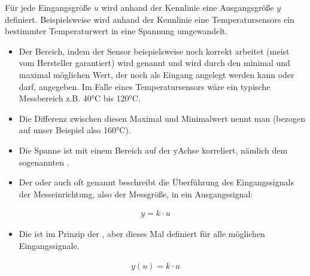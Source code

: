 \documentclass[letterpaper,10pt,english]{jupyterBook}
\begin{document}
\sphinxAtStartPar
Für jede Eingangsgröße \(u\) wird anhand der Kennlinie eine Ausgangsgröße \(y\) definiert. Beispielsweise wird anhand der Kennlinie eine Temperatursensors ein bestimmter Temperaturwert in eine Spannung umgewandelt.
\begin{itemize}
\item {} 
\sphinxAtStartPar
Der Bereich, indem der Sensor beispielsweise noch korrekt arbeitet (meist vom Hersteller garantiert) wird  genannt und wird durch den minimal und maximal möglichen Wert, der noch als Eingang angelegt werden kann oder darf, angegeben. Im Falle eines Temperatursensors wäre ein typische Messbereich z.B. \sphinxhyphen{}40°C bis 120°C.

\item {} 
\sphinxAtStartPar
Die Differenz zwischen diesen Maximal\sphinxhyphen{} und Minimalwert nennt man  (bezogen auf unser Beispiel also 160°C).

\item {} 
\sphinxAtStartPar
Die Spanne ist mit einem Bereich auf der y\sphinxhyphen{}Achse korreliert, nämlich dem sogenannten .

\item {} 
\sphinxAtStartPar
Der  oder auch oft  genannt beschreibt die Überführung des Eingangssignals der Messeinrichtung, also der Messgröße, in ein Ausgangssignal:

\end{itemize}
\begin{equation*}
\begin{split}y = k \cdot u\end{split}
\end{equation*}\begin{itemize}
\item {} 
\sphinxAtStartPar
Die  ist im Prinzip der , aber dieses Mal definiert für alle möglichen Eingangssignale.

\end{itemize}
\begin{equation*}
\begin{split}y(u) = k \cdot u\end{split}
\end{equation*}
\end{document}
